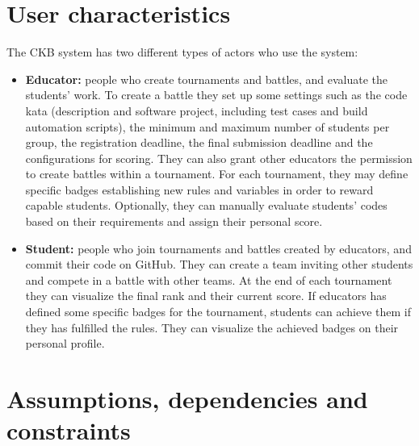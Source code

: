 \section{User characteristics}
The CKB system has two different types of actors who use the system:
\begin{itemize}
    \item \textbf{Educator:} people who create tournaments and battles, and evaluate the students' work. 
    To create a battle they set up some settings such as the code kata (description and software project, including test cases and build
    automation scripts), the minimum and maximum number of students per group, the registration deadline, the final submission deadline and the configurations for scoring.
    They can also grant other educators the permission to create battles within a tournament. 
    For each tournament, they may define specific badges establishing new rules and variables in order to reward capable students.
    Optionally, they can manually evaluate students' codes based on their requirements and assign their personal score. 
    \item \textbf{Student:} people who join tournaments and battles created by educators, and commit their code on GitHub. 
    They can create a team inviting other students and compete in a battle with other teams. 
    At the end of each tournament they can visualize the final rank and their current score. 
    If educators has defined some specific badges for the tournament, students can achieve them if they has fulfilled the rules. 
    They can visualize the achieved badges on their personal profile. 
\end{itemize}

\section{Assumptions, dependencies and constraints}

